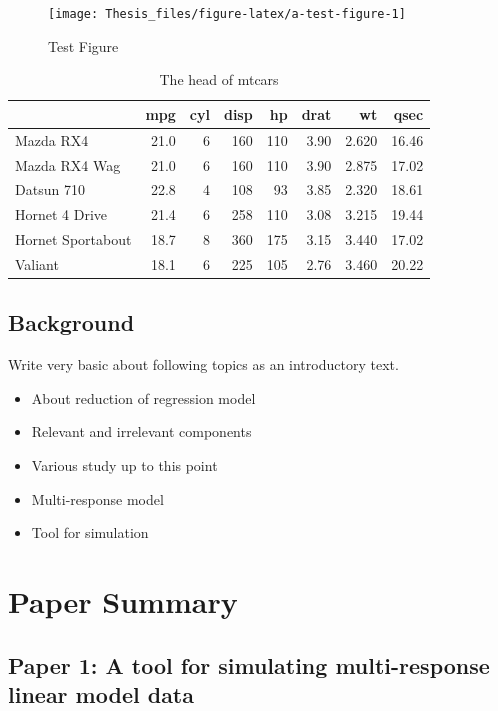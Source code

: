 \documentclass[11pt,twoside,openright,titlepage,
  headinclude,footinclude,BCOR=5mm,
  numbers=noenddot,cleardoublepage=empty,
  tablecaptionabove, dottedtoc,
  bibliography=totoc]{scrreprt}
\providecommand{\tightlist}{%
  \setlength{\itemsep}{0pt}\setlength{\parskip}{0pt}}
\begin{document}
\begin{figure}[!htb]
\texttt{[image: Thesis\_files/figure-latex/a-test-figure-1]} \caption{Test Figure}\label{fig:a-test-figure}
\end{figure}

\begin{table}[t]

\caption{\label{tab:a-test-table}The head of mtcars}
\centering
\begin{tabular}{lrrrrrrr}
\toprule
  & mpg & cyl & disp & hp & drat & wt & qsec\\
\midrule
Mazda RX4 & 21.0 & 6 & 160 & 110 & 3.90 & 2.620 & 16.46\\
Mazda RX4 Wag & 21.0 & 6 & 160 & 110 & 3.90 & 2.875 & 17.02\\
Datsun 710 & 22.8 & 4 & 108 & 93 & 3.85 & 2.320 & 18.61\\
Hornet 4 Drive & 21.4 & 6 & 258 & 110 & 3.08 & 3.215 & 19.44\\
Hornet Sportabout & 18.7 & 8 & 360 & 175 & 3.15 & 3.440 & 17.02\\
\addlinespace
Valiant & 18.1 & 6 & 225 & 105 & 2.76 & 3.460 & 20.22\\
\bottomrule
\end{tabular}
\end{table}

\hypertarget{background}{%
\section{Background}\label{background}}

Write very basic about following topics as an introductory text.

\begin{itemize}
\tightlist
\item
  About reduction of regression model
\item
  Relevant and irrelevant components
\item
  Various study up to this point
\item
  Multi-response model
\item
  Tool for simulation
\end{itemize}

\hypertarget{paper-summary}{%
\chapter{Paper Summary}\label{paper-summary}}

\hypertarget{paper-1-a-tool-for-simulating-multi-response-linear-model-data}{%
\section{Paper 1: A tool for simulating multi-response linear model data}\label{paper-1-a-tool-for-simulating-multi-response-linear-model-data}}
\end{document}

